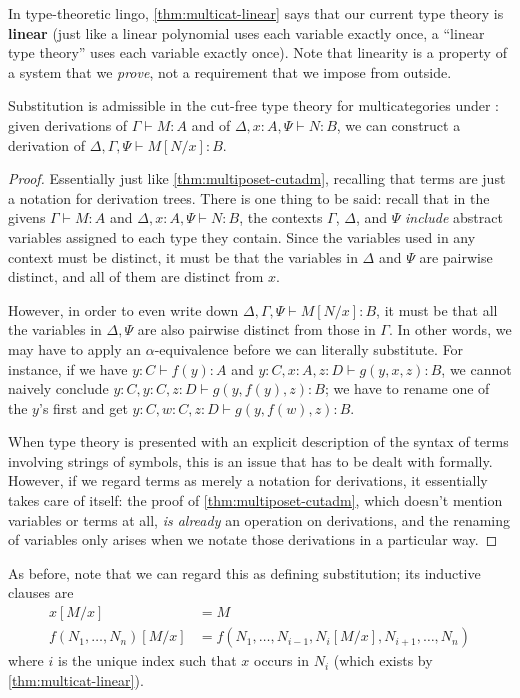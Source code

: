 \documentclass{book}
\let\types\vdash
\begin{document}
In type-theoretic lingo, \cref{thm:multicat-linear} says that our current type theory is \textbf{linear} (just like a linear polynomial uses each variable exactly once, a ``linear type theory'' uses each variable exactly once).
Note that linearity is a property of a system that we \emph{prove}, not a requirement that we impose from outside.

\begin{thm}\label{thm:multicat-subadm}
  Substitution is admissible in the cut-free type theory for multicategories under \cG: given derivations of $\Gamma\types M:A$ and of $\Delta,x:A,\Psi\types N:B$, we can construct a derivation of $\Delta,\Gamma,\Psi\types M[N/x]:B$.
\end{thm}
\begin{proof}
  Essentially just like \cref{thm:multiposet-cutadm}, recalling that terms are just a notation for derivation trees.
  There is one thing to be said: recall that in the givens $\Gamma\types M:A$ and $\Delta,x:A,\Psi \types N:B$, the contexts $\Gamma$, $\Delta$, and $\Psi$ \emph{include} abstract variables assigned to each type they contain.
  Since the variables used in any context must be distinct, it must be that the variables in $\Delta$ and $\Psi$ are pairwise distinct, and all of them are distinct from $x$.

  However, in order to even write down $\Delta,\Gamma,\Psi\types M[N/x]:B$, it must be that all the variables in $\Delta,\Psi$ are also pairwise distinct from those in $\Gamma$.
  In other words, we may have to apply an $\alpha$-equivalence before we can literally substitute.
  For instance, if we have $y:C\types f(y):A$ and $y:C,x:A,z:D\types g(y,x,z):B$, we cannot naively conclude $y:C,y:C,z:D\types g(y,f(y),z):B$; we have to rename one of the $y$'s first and get $y:C,w:C,z:D\types g(y,f(w),z):B$.

  When type theory is presented with an explicit description of the syntax of terms involving strings of symbols, this is an issue that has to be dealt with formally.
  However, if we regard terms as merely a notation for derivations, it essentially takes care of itself: the proof of \cref{thm:multiposet-cutadm}, which doesn't mention variables or terms at all, \emph{is already} an operation on derivations, and the renaming of variables only arises when we notate those derivations in a particular way.
\end{proof}

As before, note that we can regard this as defining substitution; its inductive clauses are
\begin{align*}
  x[M/x] &= M\\
  f(N_1,\dots,N_n)[M/x] &= f(N_1,\dots,N_{i-1},N_i[M/x],N_{i+1},\dots,N_n)
\end{align*}
where $i$ is the unique index such that $x$ occurs in $N_i$ (which exists by \cref{thm:multicat-linear}).
\end{document}
